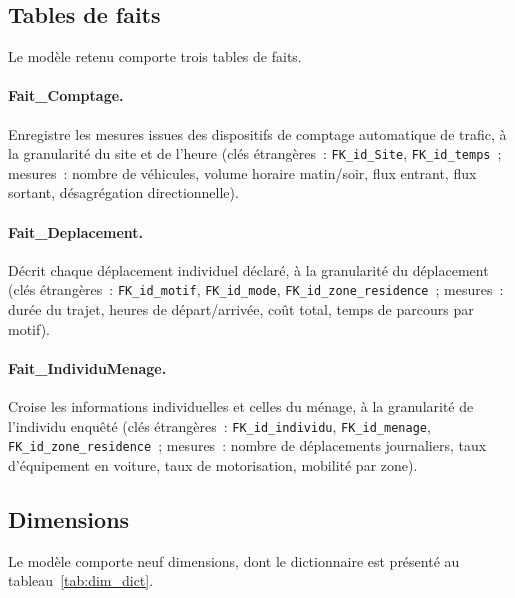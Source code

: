 \subsection{Tables de faits}
Le modèle retenu comporte trois tables de faits.

\paragraph{Fait\_Comptage.} Enregistre les mesures issues des dispositifs de comptage automatique de trafic, à la granularité du site et de l'heure (clés étrangères~: \texttt{FK\_id\_Site}, \texttt{FK\_id\_temps}~; mesures~: nombre de véhicules, volume horaire matin/soir, flux entrant, flux sortant, désagrégation directionnelle).

\paragraph{Fait\_Deplacement.} Décrit chaque déplacement individuel déclaré, à la granularité du déplacement (clés étrangères~: \texttt{FK\_id\_motif}, \texttt{FK\_id\_mode}, \texttt{FK\_id\_zone\_residence}~; mesures~: durée du trajet, heures de départ/arrivée, coût total, temps de parcours par motif).

\paragraph{Fait\_IndividuMenage.} Croise les informations individuelles et celles du ménage, à la granularité de l'individu enquêté (clés étrangères~: \texttt{FK\_id\_individu}, \texttt{FK\_id\_menage}, \texttt{FK\_id\_zone\_residence}~; mesures~: nombre de déplacements journaliers, taux d'équipement en voiture, taux de motorisation, mobilité par zone).

\subsection{Dimensions}
Le modèle comporte neuf dimensions, dont le dictionnaire est présenté au tableau~\ref{tab:dim_dict}.

